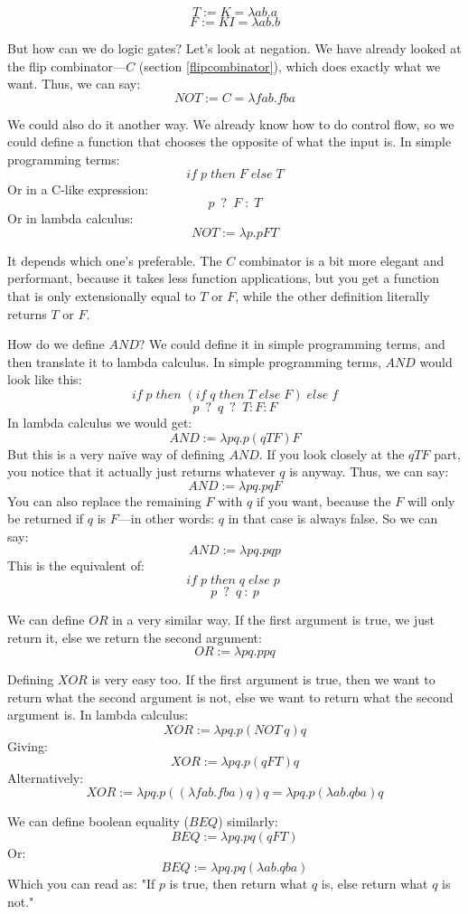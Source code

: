 \documentclass[11pt]{article}
\begin{document}
\[T:=K=\lambda ab.a\]
\[F:=KI=\lambda ab.b\]

But how can we do logic gates? Let's look at negation. We have already looked
at the flip combinator---\(C\) (section \ref{flipcombinator}), which does
exactly what we want. Thus, we can say:
\[NOT:=C=\lambda fab.fba\]

We could also do it another way. We already know how to do control flow, so we
could define a function that chooses the opposite of what the input is. In
simple programming terms:
\[if\;p\;then\;F\;else\;T\]
Or in a C-like expression:
\[p\enspace ?\enspace F\;:\;T\]
Or in lambda calculus:
\[NOT:=\lambda p.pFT\]

It depends which one's preferable. The \(C\) combinator is a bit more elegant
and performant, because it takes less function applications, but you get a
function that is only extensionally equal to \(T\) or \(F\), while the other
definition literally returns \(T\) or \(F\).

How do we define \(AND\)? We could define it in simple programming terms, and
then translate it to lambda calculus. In simple programming terms, \(AND\)
would look like this:
\[if\;p\;then\;(if\;q\;then\;T\;else\;F)\;else\;f\]
\[p\enspace ?\enspace q\enspace ?\enspace T:F:F\]
In lambda calculus we would get:
\[AND:=\lambda pq.p(qTF)F\]
But this is a very naïve way of defining \(AND\). If you look closely at the
\(qTF\) part, you notice that it actually just returns whatever \(q\) is
anyway. Thus, we can say:
\[AND:=\lambda pq.pqF\]
You can also replace the remaining \(F\) with \(q\) if you want, because the
\(F\) will only be returned if \(q\) is \(F\)---in other words: \(q\) in that
case is always false. So we can say:
\[AND:=\lambda pq.pqp\]
This is the equivalent of:
\[if\; p\; then\; q\; else\; p\;\]
\[p\enspace ?\enspace q\::\:p\]

We can define \(OR\) in a very similar way. If the first argument is true, we
just return it, else we return the second argument:
\[OR:=\lambda pq.ppq\]

Defining \(XOR\) is very easy too. If the first argument is true, then we want
to return what the second argument is not, else we want to return what the
second argument is. In lambda calculus:
\[XOR:=\lambda pq.p(NOT\:q)q\]
Giving:
\[XOR:=\lambda pq.p(qFT)q\]
Alternatively:
\[XOR:=\lambda pq.p((\lambda fab.fba)q)q=\lambda pq.p(\lambda ab.qba)q\]

We can define boolean equality (\(BEQ\)) similarly:
\[BEQ:=\lambda pq.pq(qFT)\]
Or:
\[BEQ:=\lambda pq.pq(\lambda ab.qba)\]
Which you can read as: "If \(p\) is true, then return what \(q\) is, else
return what \(q\) is not."
\end{document}
